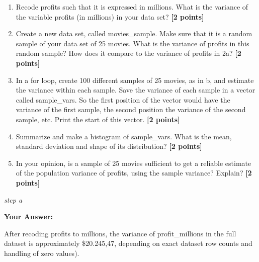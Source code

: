 \documentclass[
]{article}
\newenvironment{Shaded}{\begin{snugshade}}{\end{snugshade}}
\newcommand{\AttributeTok}[1]{\textcolor[rgb]{0.13,0.29,0.53}{#1}}
\newcommand{\DecValTok}[1]{\textcolor[rgb]{0.00,0.00,0.81}{#1}}
\newcommand{\FunctionTok}[1]{\textcolor[rgb]{0.13,0.29,0.53}{\textbf{#1}}}
\newcommand{\NormalTok}[1]{#1}
\newcommand{\OtherTok}[1]{\textcolor[rgb]{0.56,0.35,0.01}{#1}}
\newcommand{\SpecialCharTok}[1]{\textcolor[rgb]{0.81,0.36,0.00}{\textbf{#1}}}
\providecommand{\tightlist}{%
  \setlength{\itemsep}{0pt}\setlength{\parskip}{0pt}}
\begin{document}
\begin{enumerate}
\def\labelenumi{\alph{enumi}.}
\tightlist
\item
  Recode profits such that it is expressed in millions. What is the
  variance of the variable profits (in millions) in your data set?
  \textbf{[2 points]}
\item
  Create a new data set, called movies\_sample. Make sure that it is a
  random sample of your data set of 25 movies. What is the variance of
  profits in this random sample? How does it compare to the variance of
  profits in 2a? \textbf{[2 points]}
\item
  In a for loop, create 100 different samples of 25 movies, as in b, and
  estimate the variance within each sample. Save the variance of each
  sample in a vector called sample\_vars. So the first position of the
  vector would have the variance of the first sample, the second
  position the variance of the second sample, etc. Print the start of
  this vector. \textbf{[2 points]}
\item
  Summarize and make a histogram of sample\_vars. What is the mean,
  standard deviation and shape of its distribution? \textbf{[2 points]}
\item
  In your opinion, is a sample of 25 movies sufficient to get a reliable
  estimate of the population variance of profits, using the sample
  variance? Explain? \textbf{[2 points]}
\end{enumerate}

\emph{step a}

\begin{Shaded}
\end{Shaded}

\textbf{Your Answer:}

After recoding profits to millions, the variance of profit\_millions in
the full dataset is approximately \$20.245,47, depending on exact
dataset row counts and handling of zero values).
\end{document}
